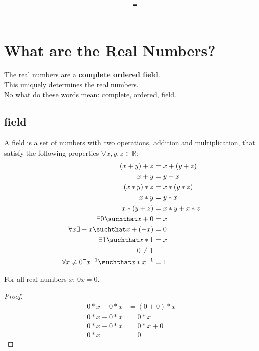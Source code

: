 \documentclass[answers,12pt,addpoints]{exam}
\author{\name}
\title{\course \ - \assignment}
\begin{document}
\maketitle


\newpage
\section*{What are the Real Numbers?}
The real numbers are a \textbf{complete ordered field}. \\
This uniquely determines the real numbers. \\
No what do these words mean: complete, ordered, field. \\
\subsection{field}
A field is a set of numbers with two operations, addition and multiplication, that satisfy the following properties $\forall x,y,z \in \mathbb{R}$:
\begin{align*}
    (x+y)+z &= x+(y+z)\\
    x+y &= y+x\\
    (x*y)*z &= x*(y*z)\\
    x*y &= y*x\\
    x*(y+z) &= x*y+x*z\\
    \exists 0 \suchthat x+0 &= x\\
    \forall x \exists -x \suchthat x+(-x) &= 0\\
    \exists 1 \suchthat x*1 &= x\\
    0 \neq 1\\
    \forall x \neq 0 \exists x^{-1} \suchthat x*x^{-1} &= 1
\end{align*}
\begin{theorem}
    For all real numbers $x$: $0x = 0$.
    \begin{proof}
        \begin{align*}
            0*x + 0*x &= (0+0)*x\\
            0*x + 0*x &= 0*x\\
            0*x + 0*x &= 0*x + 0\\
            0*x &= 0
        \end{align*}
    \end{proof}
\end{theorem}
\end{document}

